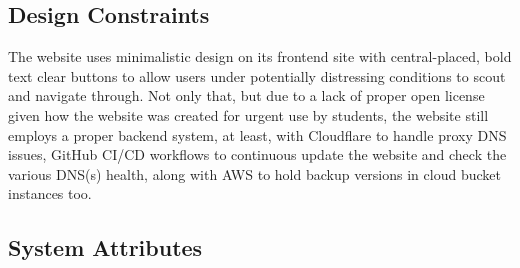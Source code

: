 \subsection{Design Constraints}

The \afetbilgi website uses minimalistic design on its frontend site with central-placed, bold text clear buttons to allow users under potentially distressing conditions to scout and navigate through. Not only that, but due to a lack of proper open license given how the website was created for urgent use by students, the website still employs a proper backend system, at least, with Cloudflare to handle proxy DNS issues, GitHub CI/CD workflows to continuous update the website and check the various DNS(s) health, along with AWS to hold backup versions in cloud bucket instances too.

\vfill
\newpage

\subsection{System Attributes}

